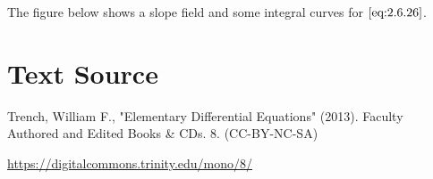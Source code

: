 \documentclass{ximera}
\begin{document}
\begin{example}
The figure below shows a slope field and some integral curves
 for $\eqref{eq:2.6.26}$.

\begin{center}
\end{center}
 

\end{example}

\section*{Text Source}
Trench, William F., "Elementary Differential Equations" (2013). Faculty Authored and Edited Books \& CDs. 8. (CC-BY-NC-SA)

\href{https://digitalcommons.trinity.edu/mono/8/}{https://digitalcommons.trinity.edu/mono/8/}
\end{document}
